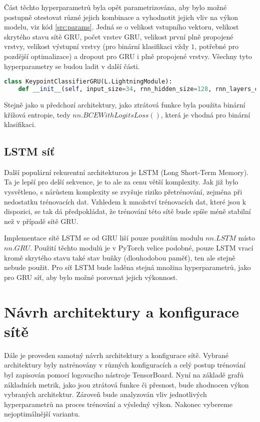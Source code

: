 Část těchto hyperparametrů byla opět parametrizována, aby bylo možné postupně
otestovat různé jejich kombinace a vyhodnotit jejich vliv na výkon modelu, viz
kód \ref{src:params}. Jedná se o velikost vstupního vektoru, velikost skrytého
stavu sítě GRU, počet vrstev GRU, velikost první plně propojené vrstvy,
velikost výstupní vrstvy (pro binární klasifikaci vždy $1$, potřebné pro
pozdější optimalizace) a dropout pro GRU i plně propojené vrstvy. Všechny tyto
hyperparametry se budou ladit v další části.

\begin{lstlisting}[language=Python, label=src:params, caption={Parametry konstruktoru třídy $KeypointClassifierGRU$ definující hyperparametry sítě}]
class KeypointClassifierGRU(L.LightningModule):
    def __init__(self, input_size=34, rnn_hidden_size=128, rnn_layers_count=2, fc_size=128, output_size=1, rnn_dropout=0.3, fc_dropout=0.3, device=None):
\end{lstlisting}

Stejně jako u předchozí architektury, jako ztrátová funkce byla použita binární
křížová entropie, tedy $nn.BCEWithLogitsLoss()$, která je vhodná pro binární
klasifikaci.

\subsection{LSTM síť}

Další populární rekurentní architekturou je LSTM (Long Short-Term Memory). Ta
je lepší pro delší sekvence, je to ale za cenu větší komplexity. Jak již bylo
vysvětleno, s nárůstem komplexity se zvyšuje riziko přetrénování, zejména při
nedostatku trénovacích dat. Vzhledem k množství trénovacích dat, které jsou k
dispozici, se tak dá předpokládat, že trénování této sítě bude spíše méně
stabilní než v případě sítě GRU.

Implementace sítě LSTM se od GRU liší pouze použitím modulu $nn.LSTM$ místo
$nn.GRU$. Použití těchto modulů je v PyTorch velice podobné, pouze LSTM vrací
kromě skrytého stavu také stav buňky (dlouhodobou paměť), ten ale stejně nebude
použit. Pro síť LSTM bude laděna stejná množina hyperparametrů, jako pro GRU
síť, aby bylo možné porovnat jejich výkonnost.

\section{Návrh architektury a konfigurace sítě}

Dále je proveden samotný návrh architektury a konfigurace sítě. Vybrané
architektury byly natrénovány v různých konfiguracích a celý postup trénování
byl zapisován pomocí logovacího nástroje TensorBoard. Nyní na základě grafů
základních metrik, jako jsou ztrátová funkce či přesnost, bude zhodnocen výkon
vybraných architektur. Zároveň bude analyzován vliv jednotlivých hyperparametrů
na proces trénování a výsledný výkon. Nakonec vybereme nejoptimálnější
variantu.

